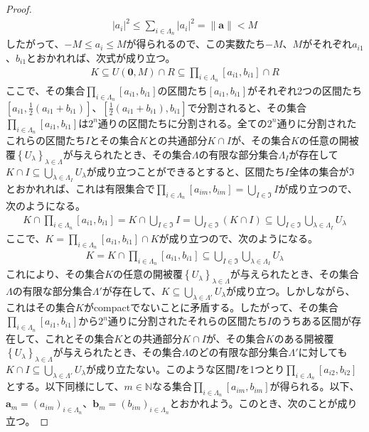 \documentclass[dvipdfmx]{jsarticle}
\begin{document}
\begin{proof}
\begin{align*}
\left| a_{i} \right|^{2} \leq \sum_{i \in \varLambda_{n}} \left| a_{i} \right|^{2} = \left\| \mathbf{a} \right\| < M
\end{align*}
したがって、$- M \leq a_{i} \leq M$が得られるので、この実数たち$- M$、$M$がそれぞれ$a_{i1}$、$b_{i1}$とおかれれば、次式が成り立つ。
\begin{align*}
K \subseteq U\left( \mathbf{0},M \right) \cap R \subseteq \prod_{i \in \varLambda_{n}} \left[ a_{i1},b_{i1} \right] \cap R
\end{align*}
ここで、その集合$\prod_{i \in \varLambda_{n}} \left[ a_{i1},b_{i1} \right]$の区間たち$\left[ a_{i1},b_{i1} \right]$がそれぞれ2つの区間たち$\left[ a_{i1},\frac{1}{2}\left( a_{i1} + b_{i1} \right) \right]$、$\left[ \frac{1}{2}\left( a_{i1} + b_{i1} \right),b_{i1} \right]$で分割されると、その集合$\prod_{i \in \varLambda_{n}} \left[ a_{i1},b_{i1} \right]$は$2^{n}$通りの区間たちに分割される。全ての$2^{n}$通りに分割されたこれらの区間たち$I$とその集合$K$との共通部分$K \cap I$が、その集合$K$の任意の開被覆$\left\{ U_{\lambda} \right\}_{\lambda \in \varLambda}$が与えられたとき、その集合$\varLambda$の有限な部分集合$\varLambda_{I}$が存在して$K \cap I \subseteq \bigcup_{\lambda \in \varLambda_{I}} U_{\lambda}$が成り立つことができるとすると、区間たち$I$全体の集合が$\mathfrak{I}$とおかれれば、これは有限集合で$\prod_{i \in \varLambda_{n}} \left[ a_{im},b_{im} \right] = \bigcup_{I\in \mathfrak{I}} I$が成り立つので、次のようになる。
\begin{align*}
K \cap \prod_{i \in \varLambda_{n}} \left[ a_{i1},b_{i1} \right] = K \cap \bigcup_{I\in \mathfrak{I}} I = \bigcup_{I\in \mathfrak{I}} (K \cap I) \subseteq \bigcup_{I\in \mathfrak{I}} {\bigcup_{\lambda \in \varLambda_{I}} U_{\lambda}}
\end{align*}
ここで、$K = \prod_{i \in \varLambda_{n}} \left[ a_{i1},b_{i1} \right] \cap K$が成り立つので、次のようになる。
\begin{align*}
K = K \cap \prod_{i \in \varLambda_{n}} \left[ a_{i1},b_{i1} \right] \subseteq \bigcup_{I\in \mathfrak{I}} {\bigcup_{\lambda \in \varLambda_{I}} U_{\lambda}}
\end{align*}
これにより、その集合$K$の任意の開被覆$\left\{ U_{\lambda} \right\}_{\lambda \in \varLambda}$が与えられたとき、その集合$\varLambda$の有限な部分集合$\varLambda'$が存在して、$K \subseteq \bigcup_{\lambda \in \varLambda'} U_{\lambda}$が成り立つ。しかしながら、これはその集合$K$がcompactでないことに矛盾する。したがって、その集合$\prod_{i \in \varLambda_{n}} \left[ a_{i1},b_{i1} \right]$から$2^{n}$通りに分割されたそれらの区間たち$I$のうちある区間が存在して、これとその集合$K$との共通部分$K \cap I$が、その集合$K$のある開被覆$\left\{ U_{\lambda} \right\}_{\lambda \in \varLambda}$が与えられたとき、その集合$\varLambda$のどの有限な部分集合$\varLambda'$に対しても$K \cap I \subseteq \bigcup_{\lambda \in \varLambda'} U_{\lambda}$が成り立たない。このような区間$I$を1つとり$\prod_{i \in \varLambda_{n}} \left[ a_{i2},b_{i2} \right]$とする。以下同様にして、$m \in \mathbb{N}$なる集合$\prod_{i \in \varLambda_{n}} \left[ a_{im},b_{im} \right]$が得られる。以下、$\mathbf{a}_{m} = \left( a_{im} \right)_{i \in \varLambda_{n}}$、$\mathbf{b}_{m} = \left( b_{im} \right)_{i \in \varLambda_{n}}$とおかれよう。このとき、次のことが成り立つ。

\end{proof}
\end{document}
